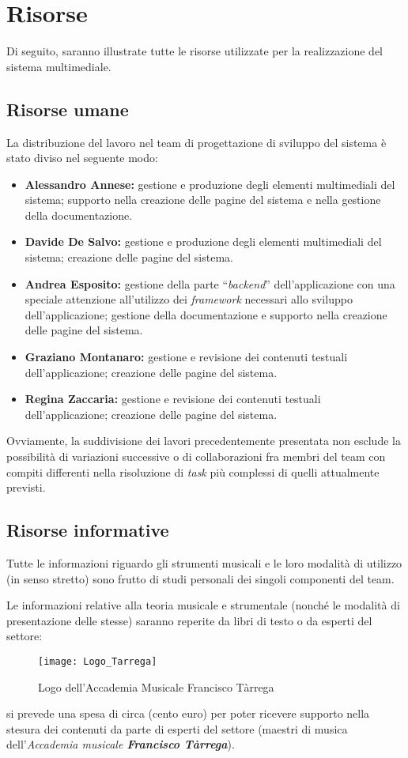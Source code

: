 \section{Risorse}
Di seguito, saranno illustrate tutte le risorse utilizzate per la realizzazione
del sistema multimediale.

\subsection{Risorse umane}
La distribuzione del lavoro nel team di progettazione di sviluppo del sistema è
stato diviso nel seguente modo:
\begin{itemize}
	\item \textbf{Alessandro Annese:} gestione e produzione degli elementi
	multimediali del sistema; supporto nella creazione delle pagine del sistema
	e nella gestione della documentazione.
	\item \textbf{Davide De Salvo:} gestione e produzione degli elementi
	multimediali del sistema; creazione delle pagine del sistema.
	\item \textbf{Andrea Esposito:} gestione della parte ``\textit{backend}''
	dell'applicazione con una speciale attenzione all'utilizzo dei
	\textit{framework} necessari allo sviluppo dell'applicazione; gestione della
	documentazione e supporto nella creazione delle pagine del sistema.
	\item \textbf{Graziano Montanaro:} gestione e revisione dei contenuti
	testuali dell'applicazione; creazione delle pagine del sistema.
	\item \textbf{Regina Zaccaria:} gestione e revisione dei contenuti testuali
	dell'applicazione; creazione delle pagine del sistema.
\end{itemize}
Ovviamente, la suddivisione dei lavori precedentemente presentata non esclude la
possibilità di variazioni successive o di collaborazioni fra membri del team con
compiti differenti nella risoluzione di \textit{task} più complessi di quelli
attualmente previsti.

\subsection{Risorse informative}\label{sec:risorse-informative}
Tutte le informazioni riguardo gli strumenti musicali e le loro modalità di
utilizzo (in senso stretto) sono frutto di studi personali dei singoli
componenti del team. 

Le informazioni relative alla teoria musicale e strumentale (nonché le modalità
di presentazione delle stesse) saranno reperite da libri di testo o da esperti
del settore: 
\begin{wrapfigure}{r}{0.45\textwidth}
	\texttt{[image: Logo\_Tarrega]}
	\label{fig:logo-tarrega}
	\caption{Logo dell'Accademia Musicale Francisco Tàrrega}
\end{wrapfigure}
si prevede una spesa di circa  (cento euro) per poter ricevere supporto
nella stesura dei contenuti da parte di esperti del settore (maestri di musica
dell'\emph{Accademia musicale \textbf{Francisco Tàrrega}}). 

